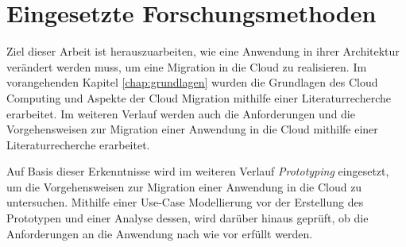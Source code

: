 \chapter{Eingesetzte Forschungsmethoden}
Ziel dieser Arbeit ist herauszuarbeiten, wie eine Anwendung in ihrer Architektur verändert werden muss, um eine Migration in die Cloud zu realisieren. Im vorangehenden Kapitel \ref{chap:grundlagen} wurden die Grundlagen des Cloud Computing und Aspekte der Cloud Migration mithilfe einer Literaturrecherche erarbeitet. Im weiteren Verlauf werden auch die Anforderungen und die Vorgehensweisen zur Migration einer Anwendung in die Cloud mithilfe einer Literaturrecherche erarbeitet.

Auf Basis dieser Erkenntnisse wird im weiteren Verlauf \textit{Prototyping} eingesetzt, um die Vorgehensweisen zur Migration einer Anwendung in die Cloud zu untersuchen. Mithilfe einer Use-Case Modellierung vor der Erstellung des Prototypen und  einer Analyse dessen, wird darüber hinaus geprüft, ob die Anforderungen an die Anwendung nach wie vor erfüllt werden.


% 

